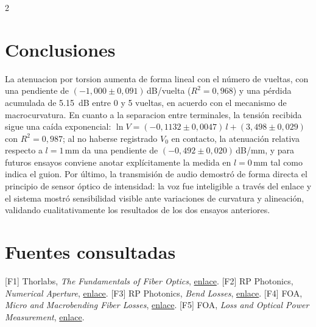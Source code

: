 \documentclass[12pt,a4paper]{article}
\begin{document}
\begin{multicols}{2}
\section{Conclusiones}

La atenuacion por torsion aumenta de forma lineal con el número de vueltas, con una pendiente de $(-1{,}000\pm0{,}091)$\,dB/vuelta ($R^2=0{,}968$) y una pérdida acumulada de \SI{5.15}{dB} entre 0 y 5 vueltas, en acuerdo con el mecanismo de macrocurvatura. En cuanto a la separacion entre terminales, la tensión recibida sigue una caída exponencial: $\ln V=(-0{,}1132\pm0{,}0047)\,l+(3{,}498\pm0{,}029)$ con $R^2=0{,}987$; al no haberse registrado $V_0$ en contacto, la atenuación relativa respecto a $l=1$\,mm da una pendiente de $(-0{,}492\pm0{,}020)$\,dB/mm, y para futuros ensayos conviene anotar explícitamente la medida en $l=0$\,mm tal como indica el guion. Por último, la transmisión de audio demostró de forma directa el principio de sensor óptico de intensidad: la voz fue inteligible a través del enlace y el sistema mostró sensibilidad visible ante variaciones de curvatura y alineación, validando cualitativamente los resultados de los dos ensayos anteriores.

\section*{Fuentes consultadas}

[F1] Thorlabs, \emph{The Fundamentals of Fiber Optics}, \href{https://www.thorlabs.us/newgrouppage9.cfm?objectgroup_id=14202}{enlace}. [F2] RP Photonics, \emph{Numerical Aperture}, \href{https://www.rp-photonics.com/numerical_aperture.html}{enlace}. [F3] RP Photonics, \emph{Bend Losses}, \href{https://www.rp-photonics.com/bend_losses.html}{enlace}. [F4] FOA, \emph{Micro and Macrobending Fiber Losses}, \href{https://foa.org/tech/ref/fiber/Microbending.html}{enlace}. [F5] FOA, \emph{Loss and Optical Power Measurement}, \href{https://foa.org/tech/ref/testing/test/loss.html}{enlace}.

\end{multicols}
\end{document}
